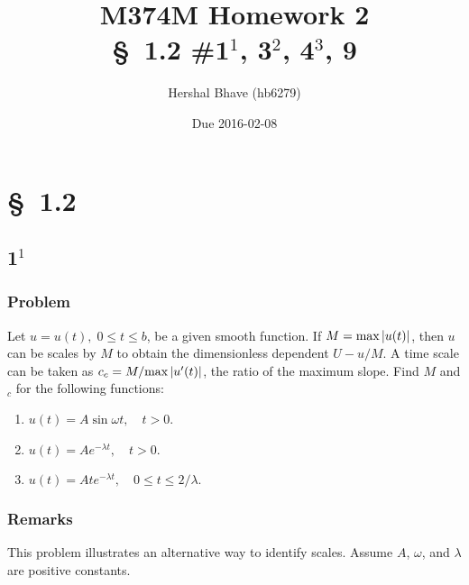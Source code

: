 \documentclass[12pt]{article}
\title{M374M Homework 2 \\
  \normalsize{\S~1.2 \#1$^1$, 3$^2$, 4$^3$, 9}}
\author{Hershal Bhave (hb6279)}
\date{Due 2016-02-08}
\begin{document}
\maketitle

\section{\S~1.2}
\subsection{1$^1$}

\subsubsection*{Problem}
Let $u=u(t),\;0 \le t \le b$, be a given smooth function. If
$M=\text{max}\left|{u(t)}\right|$, then $u$ can be scales by $M$ to obtain the
dimensionless dependent $U-u/M$. A time scale can be taken as
$c_c=M/\text{max}\left|{u'(t)}\right|$, the ratio of the maximum slope. Find $M$ and $_c$
for the following functions:
\begin{enumerate}
\item $u(t)=A\sin\omega t, \quad t>0$.
\item $u(t)=Ae^{-\lambda t},\quad t>0$.
\item $u(t)=Ate^{-\lambda t},\quad 0 \le t \le 2/\lambda.$
\end{enumerate}

\subsubsection*{Remarks}
This problem illustrates an alternative way to identify scales. Assume $A$,
$\omega$, and $\lambda$ are positive constants.
\end{document}
